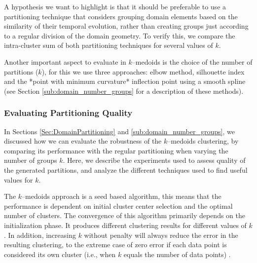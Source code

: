 A hypothesis we want to highlight is that it should be preferable to use a partitioning technique that considers grouping domain elements based on the similarity of their temporal evolution, rather than creating groups just according to a regular division of the domain geometry. To verify this, we compare the intra-cluster sum of both partitioning techniques for several values of $k$.

Another important aspect to evaluate in $k$--medoids is the choice of the number of partitions ($k$), for this we use three approaches: elbow method, silhouette index and the *point with minimum curvature* inflection point using a smooth spline (see Section \ref{sub:domain_number_groups} for a description of these methods).

\subsubsection{Evaluating Partitioning Quality}
\label{Sec:EvaluatingPP}

In Sections \ref{Sec:DomainPartitioning} and \ref{sub:domain_number_groups}, we discussed how we can evaluate the robustness of the $k$--medoids clustering, by comparing its performance with the regular partitioning when varying the number of groups $k$. Here, we describe the experiments used to assess quality of the generated partitions, and analyze the different techniques used to find useful values for $k$.  %

The $k$--medoids approach is a seed based algorithm, this means that the performance is dependent on initial cluster center selection and the optimal number of clusters. The convergence of this algorithm primarily depends on the initialization phase. It produces different clustering results for different values of $k$. In addition, increasing $k$ without penalty will always reduce the error in the resulting clustering, to the extreme case of zero error if each data point is considered its own cluster (i.e., when $k$ equals the number of data points) \cite{HastieTF2009}. 

